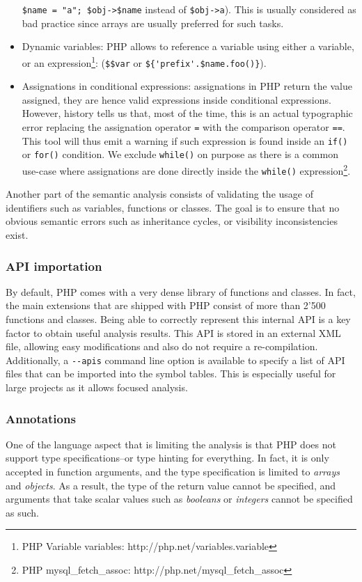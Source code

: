 \documentclass[a4paper]{article}
\begin{document}
\begin{itemize}
    \verb.$name = "a"; $obj->$name. instead of \verb.$obj->a.). This is usually
    considered as bad practice since arrays are usually preferred for such
    tasks.
  \item Dynamic variables: PHP allows to reference a variable using either a
    variable, or an expression\footnote{PHP Variable variables:
    http://php.net/variables.variable}: (\verb=$$var= or
    \verb=${'prefix'.$name.foo()}=).
  \item Assignations in conditional expressions: assignations in PHP return the
    value assigned, they are hence valid expressions inside conditional
    expressions. However, history tells us that, most of the time, this is an
    actual typographic error replacing the assignation operator \verb&=& with
    the comparison operator \verb&==&. This tool will thus emit a warning if
    such expression is found inside an \verb&if()& or \verb&for()& condition.
    We exclude \verb&while()& on purpose as there is a common use-case where
    assignations are done directly inside the \verb&while()&
    expression\footnote{PHP mysql\_fetch\_assoc:
    http://php.net/mysql\_fetch\_assoc}.
\end{itemize}

Another part of the semantic analysis consists of validating the usage of
identifiers such as variables, functions or classes. The goal is to ensure that
no obvious semantic errors such as inheritance cycles, or visibility
inconsistencies exist.

\subsubsection{API importation}
By default, PHP comes with a very dense library of functions and classes. In
fact, the main extensions that are shipped with PHP consist of more than 2'500
functions and classes. Being able to correctly represent this internal API is a
key factor to obtain useful analysis results. This API is stored in an external
XML file, allowing easy modifications and also do not require a re-compilation.
Additionally, a \verb=--apis= command line option is available to specify a
list of API files that can be imported into the symbol tables. This is
especially useful for large projects as it allows focused analysis.

\subsubsection{Annotations}
One of the language aspect that is limiting the analysis is that PHP does
not support type specifications--or type hinting for everything. In fact, it
is only accepted in function arguments, and the type specification is limited
to \emph{arrays} and \emph{objects}. As a result, the type of the return value
cannot be specified, and arguments that take scalar values such as
\emph{booleans} or \emph{integers} cannot be specified as such.
\end{document}
